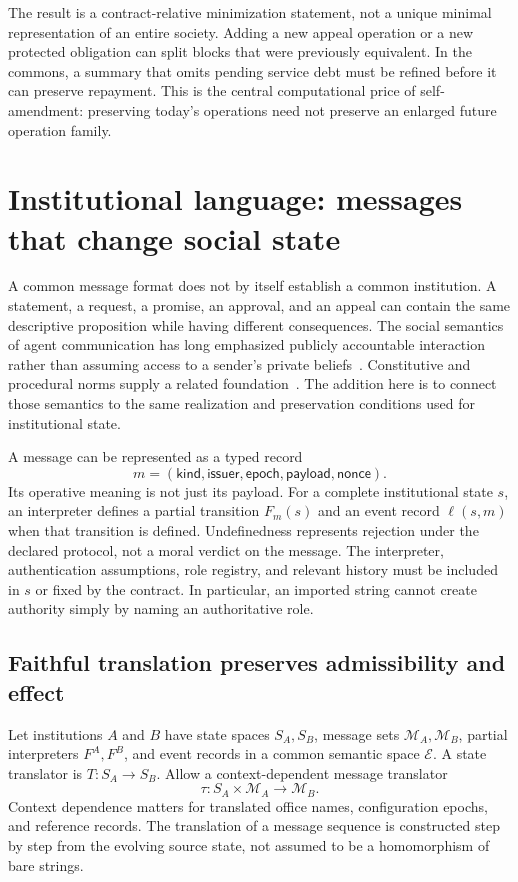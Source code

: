 The result is a contract-relative minimization statement, not a unique minimal representation of an entire society. Adding a new appeal operation or a new protected obligation can split blocks that were previously equivalent. In the commons, a summary that omits pending service debt must be refined before it can preserve repayment. This is the central computational price of self-amendment: preserving today's operations need not preserve an enlarged future operation family.

\section{Institutional language: messages that change social state}\label{MS:sec:language}
A common message format does not by itself establish a common institution. A statement, a request, a promise, an approval, and an appeal can contain the same descriptive proposition while having different consequences. The social semantics of agent communication has long emphasized publicly accountable interaction rather than assuming access to a sender's private beliefs~\cite{MS:singhacl}. Constitutive and procedural norms supply a related foundation~\cite{MS:boella,MS:grossinorm}. The addition here is to connect those semantics to the same realization and preservation conditions used for institutional state.

A message can be represented as a typed record
\[
m=(\mathsf{kind},\mathsf{issuer},\mathsf{epoch},\mathsf{payload},\mathsf{nonce}).
\]
Its operative meaning is not just its payload. For a complete institutional state $s$, an interpreter defines a partial transition $F_m(s)$ and an event record $\ell(s,m)$ when that transition is defined. Undefinedness represents rejection under the declared protocol, not a moral verdict on the message. The interpreter, authentication assumptions, role registry, and relevant history must be included in $s$ or fixed by the contract. In particular, an imported string cannot create authority simply by naming an authoritative role.

\subsection{Faithful translation preserves admissibility and effect}
Let institutions $A$ and $B$ have state spaces $S_A,S_B$, message sets $\mathcal M_A,\mathcal M_B$, partial interpreters $F^A,F^B$, and event records in a common semantic space $\mathcal E$. A state translator is $T:S_A\to S_B$. Allow a context-dependent message translator
\[
\tau:S_A\times\mathcal M_A\to\mathcal M_B.
\]
Context dependence matters for translated office names, configuration epochs, and reference records. The translation of a message sequence is constructed step by step from the evolving source state, not assumed to be a homomorphism of bare strings.

